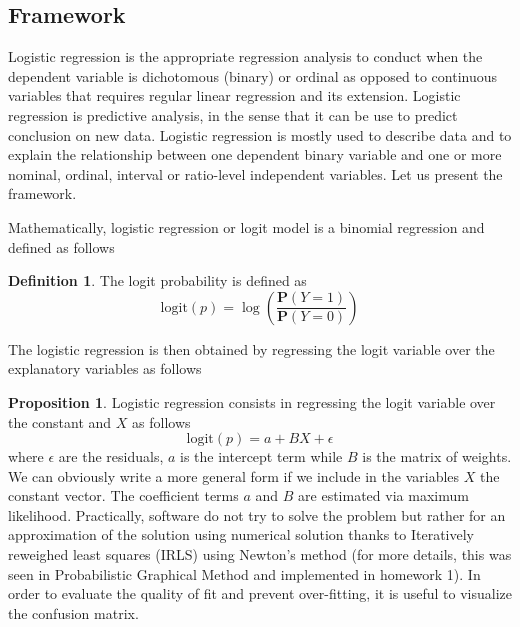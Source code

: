 \documentclass[a4paper]{article}
\theoremstyle{definition}
\theoremstyle{proposition}
\newtheorem{definition}{Definition}[section]
\newtheorem{proposition}{Proposition}[section]
\begin{document}
\subsection{Framework}
Logistic regression is the appropriate regression analysis to conduct when the dependent variable is dichotomous (binary) or ordinal as opposed to continuous variables that requires regular linear regression and its extension. Logistic regression is predictive analysis, in the sense that it can be use to predict conclusion on new data. Logistic regression is mostly used to describe data and to explain the relationship between one dependent binary variable and one or more nominal, ordinal, interval or ratio-level independent variables. Let us present the framework.

Mathematically, logistic regression or logit model is a binomial regression and defined as follows
\begin{definition}
The logit probability is defined as
\[
\text{logit}(p)= \log\left( \frac{ \mathbf{P}(Y=1)} { \mathbf{P}(Y=0)} \right)
\] 
\end{definition}

The logistic regression is then obtained by regressing the logit variable over the explanatory variables as follows
\begin{proposition}
Logistic regression consists in regressing the logit variable over the constant and $X$ as follows
\[
\text{logit}(p)= a + B X + \epsilon
\]
where $\epsilon$ are the residuals, $a$ is the intercept term while $B$ is the matrix of weights. We can obviously write a more general form if we include in the variables $X$ the constant vector.
The coefficient terms $a$ and $B$ are estimated via maximum likelihood. Practically, software do not try to solve the problem but rather for an approximation of the solution using numerical solution thanks to Iteratively reweighed least squares (IRLS) using Newton's method (for more details, this was seen in Probabilistic Graphical Method and implemented in homework 1). In order to evaluate the quality of fit and prevent over-fitting, it is useful to visualize the confusion matrix.
\end{proposition}
\end{document}
